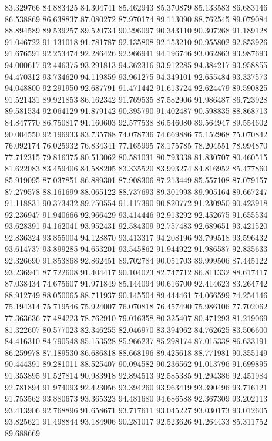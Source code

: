 83.329766
84.883425
84.304741
85.462943
85.370879
85.133583
86.683146
86.538869
86.638837
87.080272
87.970174
89.113090
88.762545
89.079084
88.894589
89.539257
89.520734
90.296097
90.343110
90.307268
91.189128
91.046722
91.131018
91.781787
92.135808
92.153210
90.955802
92.853926
91.676591
92.253474
92.286426
92.966941
94.196746
93.062863
93.987693
94.000617
92.446375
93.291813
94.362316
93.912285
94.384217
93.958855
94.470312
93.734620
94.119859
93.961275
94.349101
92.655484
93.337573
94.048800
92.291950
92.687791
91.471442
91.613724
92.624479
89.590825
91.521431
89.921853
86.162342
91.769535
87.582906
91.986487
86.723928
89.581534
92.064129
91.879142
90.395790
91.402487
90.598835
88.868713
84.847770
86.750817
91.160603
92.577538
86.546080
89.564947
89.554602
90.004550
92.196933
83.735788
74.078736
74.669886
75.152968
75.070842
76.092174
76.025932
76.834341
77.165995
78.175785
78.204551
78.994870
77.712315
79.816375
80.513062
80.581031
80.793338
81.830707
80.460515
81.622083
83.459406
84.588205
83.335520
83.993274
84.816952
85.477860
85.919095
87.037851
86.889301
87.908306
87.213449
85.557108
87.079157
87.279578
88.161699
88.065122
88.737693
89.301998
89.905164
89.667247
91.118831
90.373432
89.750554
91.117390
90.820772
91.230950
90.423918
92.236947
91.940666
92.966429
93.414446
92.913292
92.452675
91.655534
93.628391
94.162041
93.952431
92.584309
92.757483
92.689651
93.421520
92.836324
93.855004
94.128870
93.413317
94.208196
93.799518
93.596432
93.614737
93.899285
94.653201
93.545862
91.944922
91.986587
92.835633
92.326690
91.853868
92.862451
89.702784
90.051703
89.999506
87.445122
93.236941
87.722608
91.404417
90.104023
82.747712
86.811332
88.617417
87.038434
74.675607
91.971849
85.144094
90.616700
92.414623
83.264742
88.912749
88.050065
88.711937
90.145504
89.444461
74.066599
74.254146
75.194314
75.719546
75.924007
76.070818
76.457490
75.986106
77.702062
77.363636
77.484223
78.762910
79.016358
80.325407
80.471293
81.219069
81.322607
80.577023
82.346255
82.046970
83.394962
84.762625
83.506600
84.416310
84.790548
85.153528
85.966237
85.298174
87.015338
86.633191
86.259978
87.189530
86.686818
88.668196
89.425618
88.771981
90.355149
90.444391
89.281011
88.525407
90.094582
90.236562
91.013796
91.699895
91.353895
91.527814
90.983918
92.894513
92.585385
91.294386
92.451984
92.781894
91.974093
92.423056
93.394260
93.963419
93.390496
93.716121
91.753562
93.880673
93.365323
94.481680
94.686588
92.367309
93.202113
93.413906
92.768896
91.658671
93.717611
93.045227
93.030173
93.012605
93.825621
91.498844
93.184906
90.281017
92.523626
91.264433
85.311752
89.688669
